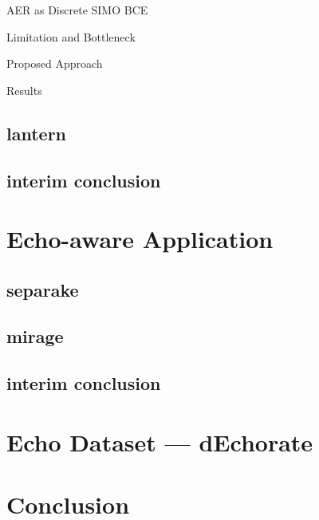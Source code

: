 \documentclass[9pt,dvipsnames]{beamer}
\begin{document}
\begin{frame}{AER as Discrete SIMO BCE}
    
\end{frame}

\begin{frame}{Limitation and Bottleneck}

\end{frame}

\begin{frame}{Proposed Approach}

\end{frame}

\begin{frame}{Results}

\end{frame}


\subsection{lantern}
\subsection{interim conclusion}

\section{Echo-aware Application}
\subsection{separake}
\subsection{mirage}

\subsection{interim conclusion}

\section{Echo Dataset --- dEchorate}
\section{Conclusion}

\end{document}
